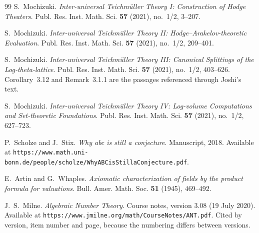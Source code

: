 \documentclass[11pt,a4paper]{article}
\theoremstyle{definition}
\theoremstyle{plain}
\theoremstyle{definition}
\begin{document}
\begin{thebibliography}{99}
S.~Mochizuki.
\newblock \emph{Inter-universal Teichmüller Theory I: Construction of Hodge
Theaters}.
\newblock Publ. Res. Inst. Math. Sci. \textbf{57} (2021), no.~1/2, 3--207.

S.~Mochizuki.
\newblock \emph{Inter-universal Teichmüller Theory II: Hodge--Arakelov-theoretic
Evaluation}.
\newblock Publ. Res. Inst. Math. Sci. \textbf{57} (2021), no.~1/2, 209--401.

S.~Mochizuki.
\newblock \emph{Inter-universal Teichmüller Theory III: Canonical Splittings of
the Log-theta-lattice}.
\newblock Publ. Res. Inst. Math. Sci. \textbf{57} (2021), no.~1/2, 403--626.
\newblock Corollary~3.12 and Remark~3.1.1 are the passages referenced through
Joshi's text.

S.~Mochizuki.
\newblock \emph{Inter-universal Teichmüller Theory IV: Log-volume Computations
and Set-theoretic Foundations}.
\newblock Publ. Res. Inst. Math. Sci. \textbf{57} (2021), no.~1/2, 627--723.

P.~Scholze and J.~Stix.
\newblock \emph{Why abc is still a conjecture}.
\newblock Manuscript, 2018. Available at
\texttt{https://www.math.uni-bonn.de/people/scholze/WhyABCisStillaConjecture.pdf}.

E.~Artin and G.~Whaples.
\newblock \emph{Axiomatic characterization of fields by the product formula for
valuations}.
\newblock Bull. Amer. Math. Soc. \textbf{51} (1945), 469--492.

J.~S.~Milne.
\newblock \emph{Algebraic Number Theory}.
\newblock Course notes, version 3.08 (19 July 2020). Available at
\texttt{https://www.jmilne.org/math/CourseNotes/ANT.pdf}. Cited by version, item
number and page, because the numbering differs between versions.


\end{thebibliography}
\end{document}

